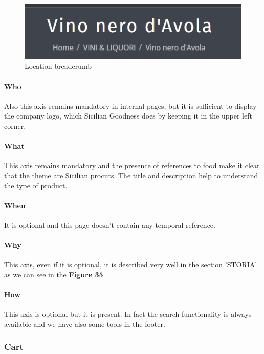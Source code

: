 \begin{figure}[H]
	\centering\includegraphics[width=12cm]{Img/location.png}
	\caption{Location breadcrumb}
\end{figure}

\paragraph{Who}
Also this axis remains mandatory in internal pages, but it is sufficient to display the company logo, which Sicilian Goodness does by keeping it in the upper left corner.

\paragraph{What}
This axis remains mandatory and the presence of references to food make it clear that the theme are Sicilian procuts. The title and description help to understand the type of product.

\paragraph{When}
It is optional and this page doesn't contain any temporal reference.

\paragraph{Why}
This axis, even if it is optional, it is described very well in the section 'STORIA' as we can see in the \textbf{\hyperlink{internalpage}{Figure 35}}

\paragraph{How}
This axis is optional but it is present. In fact the search functionality is always available and we have also some tools in the footer.

\subsubsection{Cart}

